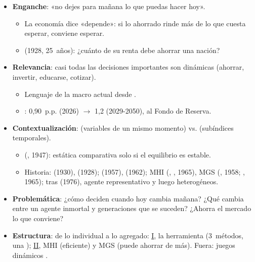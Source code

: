 \documentclass{article}
\begin{document}
\cabecerarepaso
\begin{columnas}

\begin{itemize}
\item \textbf{Enganche}: «no dejes para mañana lo que puedas hacer hoy».
  \begin{itemize}
  \item La economía dice «depende»: si lo ahorrado rinde más de lo que cuesta esperar, conviene esperar.
  \item {} (1928, 25~años): ¿cuánto de su renta debe ahorrar una nación?
  \end{itemize}
\item \textbf{Relevancia}: casi todas las decisiones importantes son dinámicas (ahorrar, invertir, educarse, cotizar).
  \begin{itemize}
  \item Lenguaje de la macro actual desde .
  \item {}: 0,90~p.p. (2026) $\to$ 1,2 (2029-2050), al Fondo de Reserva.
  \end{itemize}
\item \textbf{Contextualización}:  (variables de un mismo momento) vs.  (subíndices temporales).
  \begin{itemize}
  \item {} (, 1947): estática comparativa solo si el equilibrio es estable.
  \item Historia:  (1930),  (1928);  (1957),  (1962); MHI (, , 1965), MGS (, 1958; , 1965); tras  (1976), agente representativo y luego heterogéneos.
  \end{itemize}
\item \textbf{Problemática}: ¿cómo deciden cuando hoy cambia mañana? ¿Qué cambia entre un agente inmortal y generaciones que se suceden? ¿Ahorra el mercado lo que conviene?
\item \textbf{Estructura}: de lo individual a lo agregado: \hyperref[rep:I]{I}, la herramienta (3~métodos, una ); \hyperref[rep:II]{II}, MHI (eficiente) y MGS (puede ahorrar de más). Fuera: juegos dinámicos .
\end{itemize}


\end{columnas}
\end{document}
